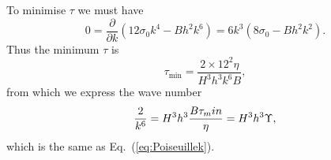 \documentclass[12pt,a4paper]{revtex4}
\begin{document}
To minimise $\tau$ we must have
\begin{equation}
0 = \frac{\partial}{\partial k}\left(12 \sigma_0 k^4 - B h^2 k^6\right) = 6k^3\left( 8 \sigma_0 - B h^2 k^2\right).
\end{equation}
Thus the minimum $\tau$ is
\begin{equation}
\tau_\text{min} = \frac{2\times12^2\eta}{H^3 h^3 k^6 B},
\end{equation}
from which we express the wave number
\begin{equation}
\frac{2\time 12}{k^6} = H^3 h^3 \frac{B\tau_min}{\eta} = H^3 h^3  \Upsilon,
\end{equation}
which is the same as Eq.~(\ref{eq:Poiseuillek}).


\end{document}
